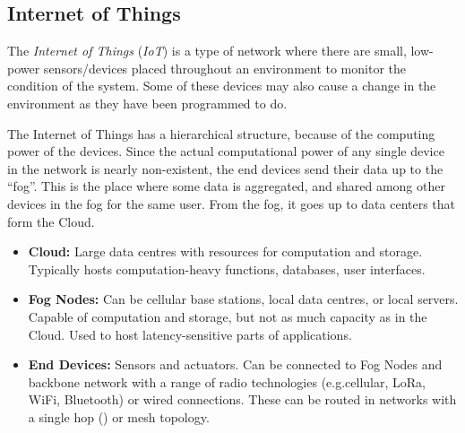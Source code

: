 \subsection{Internet of Things}\label{subsec:IoT}
\begin{definition}\label{def:IoT}
  The \emph{Internet of Things} (\emph{IoT}) is a type of network where there are small, low-power sensors/devices placed throughout an environment to monitor the condition of the system.
  Some of these devices may also cause a change in the environment as they have been programmed to do.

  The Internet of Things has a hierarchical structure, because of the computing power of the devices.
  Since the actual computational power of any single device in the network is nearly non-existent, the end devices send their data up to the ``fog''.
  This is the place where some data is aggregated, and shared among other devices in the fog for the same user.
  From the fog, it goes up to data centers that form the Cloud.

  \begin{itemize}[noitemsep]
  \item \textbf{Cloud:} Large data centres with resources for computation and storage.
    Typically hosts computation-heavy functions, databases, user interfaces.
  \item \textbf{Fog Nodes:} Can be cellular base stations, local data centres, or local servers.
    Capable of computation and storage, but not as much capacity as in the Cloud.
    Used to host latency-sensitive parts of applications.
  \item \textbf{End Devices:} Sensors and actuators.
    Can be connected to Fog Nodes and backbone network with a range of radio technologies (e.g.\@ cellular, LoRa, WiFi, Bluetooth) or wired connections.
    These can be routed in networks with a single hop () or mesh topology.
  \end{itemize}
\end{definition}

